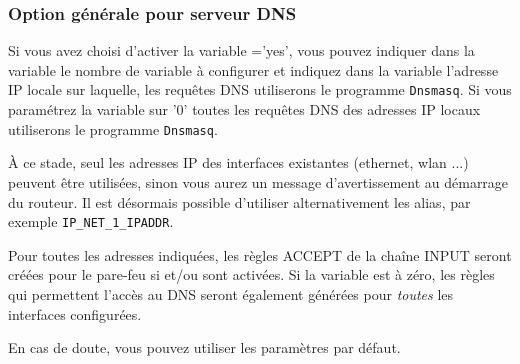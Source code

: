 \subsubsection{Option générale pour serveur DNS}

\begin{description}

      {Si vous avez choisi d'activer la variable ='yes', vous
      pouvez indiquer dans la variable  le nombre de
      variable à configurer et indiquez dans la variable 
      l'adresse IP locale sur laquelle, les requêtes DNS utiliserons
      le programme \verb+Dnsmasq+. Si vous paramétrez la variable 
      sur '0' toutes les requêtes DNS des adresses IP locaux utiliserons
      le programme \verb+Dnsmasq+.

      À ce stade, seul les adresses IP des interfaces existantes (ethernet,
      wlan ...) peuvent être utilisées, sinon vous aurez un message d'avertissement
      au démarrage du routeur. Il est désormais possible d'utiliser alternativement
      les alias, par exemple \verb+IP_NET_1_IPADDR+.

      Pour toutes les adresses indiquées, les règles ACCEPT de la chaîne INPUT
      seront créées pour le pare-feu si 
      et/ou  sont activées. Si la variable 
	  est à zéro, les règles qui permettent l'accès au DNS seront également générées pour
	  \emph{toutes} les interfaces configurées.


      En cas de doute, vous pouvez utiliser les paramètres par défaut.}


\end{description}
